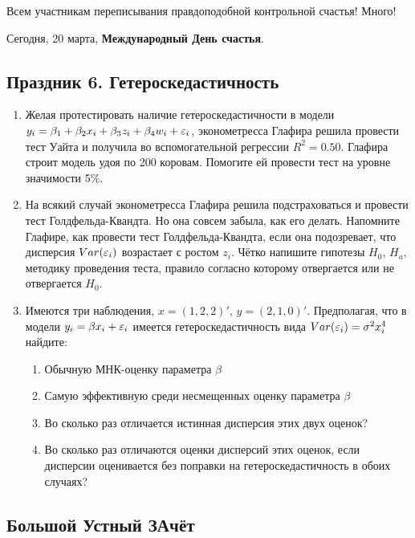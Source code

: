 \documentclass[12pt, a4paper]{article}
\theoremstyle{definition}
\begin{document}
\vspace{20pt}

Всем участникам переписывания правдоподобной контрольной счастья! Много!

\vspace{20pt}

Сегодня, 20 марта, \textbf{Международный День счастья}.


\subsection{Праздник 6. Гетероскедастичность}

\begin{enumerate}
\item Желая протестировать наличие гетероскедастичности в модели $y_i=\beta_1+\beta_2 x_i +\beta_3 z_i +\beta_4 w_i +\varepsilon_i$, эконометресса Глафира решила провести тест Уайта и получила  во вспомогательной регрессии $R^2=0.50$. Глафира строит модель удоя по 200 коровам. Помогите ей провести тест на уровне значимости 5\%.
\item На всякий случай эконометресса Глафира решила подстраховаться и провести тест Голдфельда-Квандта. Но она совсем забыла, как его делать. Напомните Глафире, как провести тест Голдфельда-Квандта, если она подозревает, что дисперсия $Var(\varepsilon_i)$ возрастает с ростом $z_i$. Чётко напишите гипотезы $H_0$, $H_a$, методику проведения теста, правило согласно которому отвергается или не отвергается $H_0$.
\item Имеются три наблюдения, $x=(1,2,2)'$, $y=(2,1,0)'$. Предполагая, что в модели $y_i=\beta x_i + \varepsilon_i$ имеется гетероскедастичность вида $Var(\varepsilon_i)=\sigma^2 x_i^4$ найдите:
\begin{enumerate}
\item Обычную МНК-оценку параметра $\beta$
\item Самую эффективную среди несмещенных оценку параметра $\beta$
\item Во сколько раз отличается истинная дисперсия этих двух оценок?
\item Во сколько раз отличаются оценки дисперсий этих оценок, если дисперсии оценивается без поправки на гетероскедастичность в обоих случаях?
\end{enumerate}
\end{enumerate}

\subsection{Большой Устный ЗАчёт}
\end{document}
